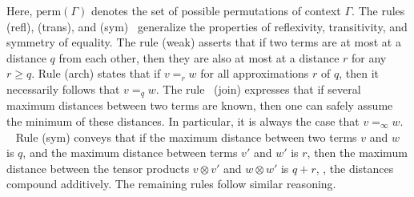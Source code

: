 Here, $\text{perm} (\Gamma)$ denotes the set of possible permutations of context $\Gamma$. 
The rules (refl), (trans), and (sym)  generalize the properties of reflexivity, transitivity, and symmetry of equality. 
The rule (weak) asserts that if two terms are at most at a distance $q$ from each other, then they are also at most at a distance $r$ for any $r \geq q$. Rule (arch) states that if $v =_r w$ for all approximations $r$ of $q$, then it necessarily follows that $v =_q w$. 
The rule  (join) expresses that if several maximum distances between two terms are known, then one can safely assume the minimum of these distances. In particular, it is always the case that $v =_{\infty} w$.  
Rule (sym) conveys that if the maximum distance between two terms $v$ and $w$ is $q$, and the maximum distance between terms $v'$ and $w'$ is $r$, then the maximum distance between the tensor products $v \otimes v'$ and $w \otimes w'$ is $q + r$, \ie, the distances compound additively. The remaining rules follow similar reasoning.



